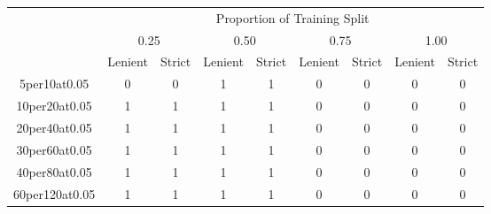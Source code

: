 \documentclass[12pt]{article}
\begin{document}
\begin{table}[]
    \begin{tabular}{|c|cc|cc|cc|cc|}
        \hline
        \textbf{}       & \multicolumn{8}{c|}{Proportion of Training Split}                                                                                                                                                                                          \\
                        & \multicolumn{2}{c}{0.25}                                 & \multicolumn{2}{c}{0.50}                                 & \multicolumn{2}{c}{0.75}                                 & \multicolumn{2}{c|}{1.00}                                 \\
                        & \multicolumn{1}{c}{Lenient} & \multicolumn{1}{c}{Strict} & \multicolumn{1}{c}{Lenient} & \multicolumn{1}{c}{Strict} & \multicolumn{1}{c}{Lenient} & \multicolumn{1}{c}{Strict} & \multicolumn{1}{c}{Lenient} & \multicolumn{1}{c|}{Strict} \\ \hline
        5per10at0.05    & 0                           & 0                          & 1                           & 1                          & 0                           & 0                          & 0                           & 0                          \\
        10per20at0.05   & 1                           & 1                          & 1                           & 1                          & 0                           & 0                          & 0                           & 0                          \\
        20per40at0.05   & 1                           & 1                          & 1                           & 1                          & 0                           & 0                          & 0                           & 0                          \\
        30per60at0.05   & 1                           & 1                          & 1                           & 1                          & 0                           & 0                          & 0                           & 0                          \\
        40per80at0.05   & 1                           & 1                          & 1                           & 1                          & 0                           & 0                          & 0                           & 0                          \\
        60per120at0.05  & 1                           & 1                          & 1                           & 1                          & 0                           & 0                          & 0                           & 0                          \\

\end{tabular}
\end{table}
\end{document}
